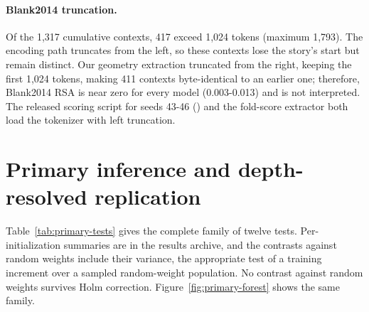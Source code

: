 \documentclass[mlmain]{jmlr}
\begin{document}
\paragraph{Blank2014 truncation.} Of the 1,317 cumulative contexts, 417 exceed 1,024 tokens (maximum 1,793). The encoding path truncates from the left, so these contexts lose the story's start but remain distinct. Our geometry extraction truncated from the right, keeping the first 1,024 tokens, making 411 contexts byte-identical to an earlier one; therefore, Blank2014 RSA is near zero for every model (0.003-0.013) and is not interpreted. The released scoring script for seeds 43-46 () and the fold-score extractor both load the tokenizer with left truncation.

\section{Primary inference and depth-resolved replication}
\label{app:primary}

Table~\ref{tab:primary-tests} gives the complete family of twelve tests. Per-initialization summaries are in the results archive, and the contrasts against random weights include their variance, the appropriate test of a training increment over a sampled random-weight population. No contrast against random weights survives Holm correction. Figure~\ref{fig:primary-forest} shows the same family.
\end{document}
